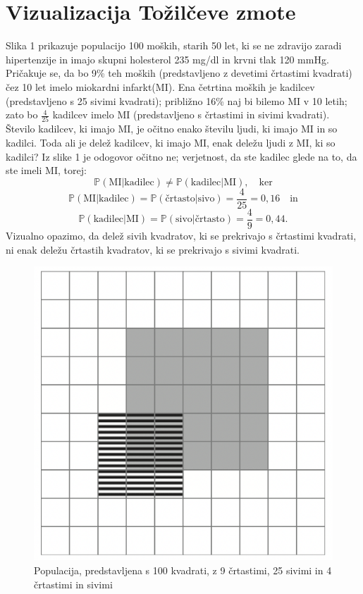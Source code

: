 \documentclass[a4paper,12pt]{article}
\begin{document}
\section{Vizualizacija Tožilčeve zmote}
Slika 1 prikazuje populacijo 100 moških, starih 50 let, ki se ne zdravijo zaradi hipertenzije in imajo skupni holesterol 235 mg/dl in krvni tlak 120 mmHg. Pričakuje
se, da bo 9\% teh moških (predstavljeno z devetimi črtastimi kvadrati) čez 10 let imelo miokardni infarkt(MI). Ena četrtina moških je kadilcev (predstavljeno s 25 
sivimi kvadrati); približno 16\% naj bi bilemo MI v 10 letih; zato bo $\frac{4}{25}$ kadilcev imelo MI (predstavljeno s črtastimi in sivimi kvadrati). \\
Število kadilcev, ki imajo MI, je očitno enako številu ljudi, ki imajo MI in so kadilci. Toda ali je delež kadilcev, ki imajo MI, enak deležu ljudi z MI, ki so kadilci? Iz 
slike 1 je odogovor očitno ne; verjetnost, da ste kadilec glede na to, da ste imeli MI, torej:
\[ \mathbb{P}(\text{MI} \lvert \text{kadilec}) \ne \mathbb{P}(\text{kadilec} \lvert \text{MI}), \quad \text{ker}\]
\[ \mathbb{P}(\text{MI} \lvert \text{kadilec}) = \mathbb{P}(\text{črtasto} \lvert \text{sivo}) = \frac{4}{25} = 0,16 \quad \text{in}\]
\[\mathbb{P}(\text{kadilec} \lvert \text{MI}) = \mathbb{P}(\text{sivo} \lvert \text{črtasto}) = \frac{4}{9} = 0,44.\]
Vizualno opazimo, da delež sivih kvadratov, ki se prekrivajo s črtastimi kvadrati, ni enak deležu črtastih kvadratov, ki se prekrivajo s sivimi kvadrati. 

\begin{figure}[!ht]
    \centering
    \label{fig:slika1}
    \includegraphics[scale=0.45]{slika1.png}
    \caption{Populacija, predstavljena s 100 kvadrati, z 9 črtastimi, 25 sivimi in 4 črtastimi in sivimi}\vspace{2mm}
 \end{figure}
\end{document}
